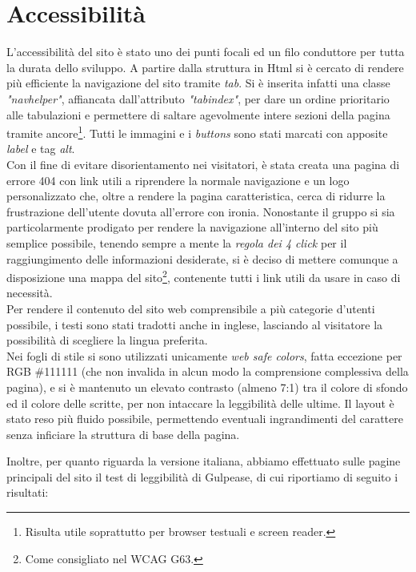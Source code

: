 \section{Accessibilità}
\label{sec:access}
L'accessibilità del sito è stato uno dei punti focali ed un filo conduttore per tutta la durata dello sviluppo. A partire dalla struttura in Html si è cercato di rendere più efficiente la navigazione del sito tramite \emph{tab}. Si è inserita infatti una classe \emph{"navhelper"}, affiancata dall'attributo \emph{"tabindex"}, per dare un ordine prioritario alle tabulazioni e permettere di saltare agevolmente intere sezioni della pagina tramite ancore\footnote{Risulta utile soprattutto per browser testuali e screen reader.}.
Tutti le immagini e i \emph{buttons} sono stati marcati con apposite \emph{label} e tag \emph{alt}.\\
Con il fine di evitare disorientamento nei visitatori, è stata creata una pagina di errore 404 con link utili a riprendere la normale navigazione e un logo personalizzato che, oltre a rendere la pagina caratteristica, cerca di ridurre la frustrazione dell'utente dovuta all'errore con ironia. Nonostante il gruppo si sia particolarmente prodigato per rendere la navigazione all'interno del sito più semplice possibile, tenendo sempre a mente la \emph{regola dei 4 click} per il raggiungimento delle informazioni desiderate, si è deciso di mettere comunque a disposizione una mappa del sito\footnote{Come consigliato nel WCAG G63.}, contenente tutti i link utili da usare in caso di necessità.\\
Per rendere il contenuto del sito web comprensibile a più categorie d'utenti possibile, i testi sono stati tradotti anche in inglese, lasciando al visitatore la possibilità di scegliere la lingua preferita.\\
Nei fogli di stile si sono utilizzati unicamente \emph{web safe colors}, fatta eccezione per RGB \#111111 (che non invalida in alcun modo la comprensione complessiva della pagina), e si è mantenuto un elevato contrasto (almeno 7:1) tra il colore di sfondo ed il colore delle scritte, per non intaccare la leggibilità delle ultime. Il layout è stato reso più fluido possibile, permettendo eventuali ingrandimenti del carattere senza inficiare la struttura di base della pagina.

\pagebreak
Inoltre, per quanto riguarda la versione italiana, abbiamo effettuato sulle pagine principali del sito il test di leggibilità di Gulpease, di cui riportiamo di seguito i risultati: \\

